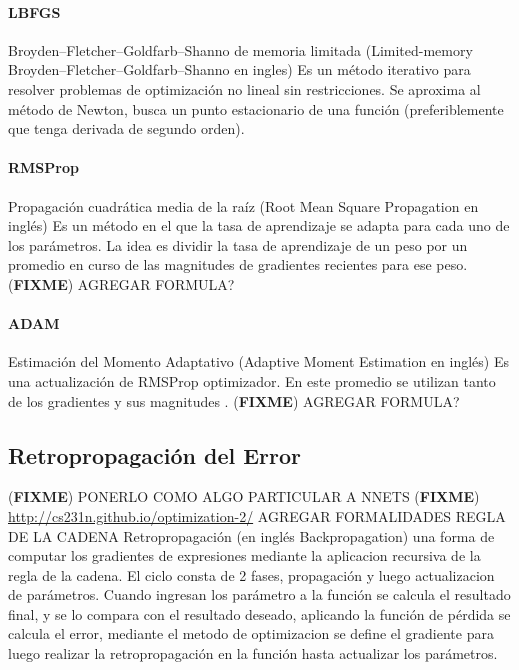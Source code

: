 \documentclass[a4paper,11pt,spanish]{book}
\newcommand*{\FIXME}[1]{{(\textbf{FIXME}) {#1}}}
\begin{document}
	\paragraph{LBFGS} Broyden–Fletcher–Goldfarb–Shanno de memoria limitada (Limited-memory  Broyden–Fletcher–Goldfarb–Shanno en ingles) Es un método iterativo para resolver problemas de optimización
	no lineal sin restricciones. Se aproxima al método de Newton,  busca un punto estacionario de una función (preferiblemente que tenga derivada de segundo orden).
	\paragraph{RMSProp} Propagación cuadrática media de la raíz (Root Mean Square Propagation en inglés) Es un método en el que la tasa de aprendizaje se adapta para cada uno de los parámetros.
	  La idea es dividir la tasa de aprendizaje de un peso por un promedio en curso de las magnitudes de gradientes recientes para ese peso.
	  \FIXME{AGREGAR FORMULA?}
	\paragraph{ADAM} Estimación del Momento Adaptativo (Adaptive Moment Estimation en inglés) Es una actualización de RMSProp optimizador.
	  En este promedio se utilizan tanto de los gradientes y sus magnitudes . \FIXME{AGREGAR FORMULA?}

    \subsection{Retropropagación del Error}\FIXME{PONERLO COMO ALGO PARTICULAR A
    NNETS}
      \FIXME{\url{http://cs231n.github.io/optimization-2/} AGREGAR FORMALIDADES REGLA DE LA CADENA}
      Retropropagación (en inglés Backpropagation) una forma  de computar los gradientes de expresiones mediante la aplicacion recursiva de la regla de la cadena.
      El ciclo consta de 2 fases, propagación y luego actualizacion de parámetros. Cuando ingresan los parámetro a la función se calcula el resultado final, y se lo compara con el resultado
      deseado, aplicando la función de pérdida se calcula el error, mediante el metodo de optimizacion se define el gradiente para luego realizar la retropropagación en la función hasta
      actualizar los parámetros.
\end{document}
